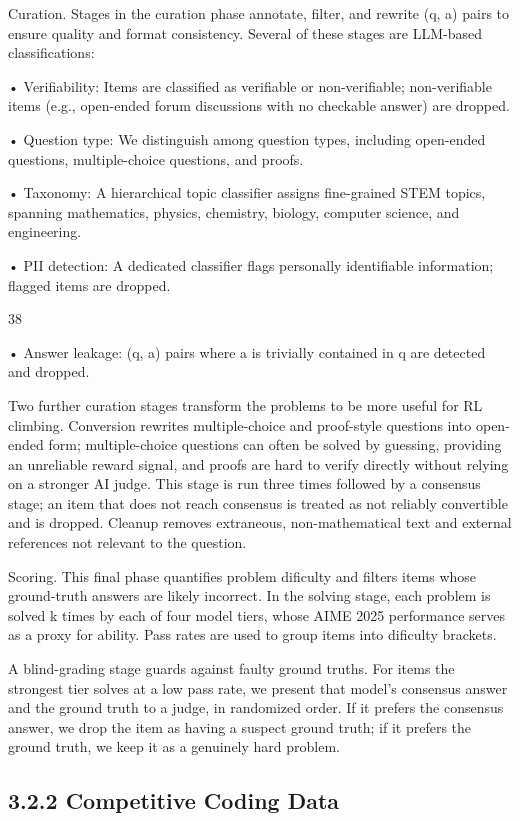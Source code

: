 \documentclass[
  10
]{article}
\begin{document}
Curation. Stages in the curation phase annotate, filter, and rewrite (q,
a) pairs to ensure quality and format consistency. Several of these
stages are LLM-based classifications:

• Verifiability: Items are classified as verifiable or non-verifiable;
non-verifiable items (e.g., open-ended forum discussions with no
checkable answer) are dropped.

• Question type: We distinguish among question types, including
open-ended questions, multiple-choice questions, and proofs.

• Taxonomy: A hierarchical topic classifier assigns fine-grained STEM
topics, spanning mathematics, physics, chemistry, biology, computer
science, and engineering.

• PII detection: A dedicated classifier flags personally identifiable
information; flagged items are dropped.

38

• Answer leakage: (q, a) pairs where a is trivially contained in q are
detected and dropped.

Two further curation stages transform the problems to be more useful for
RL climbing. Conversion rewrites multiple-choice and proof-style
questions into open-ended form; multiple-choice questions can often be
solved by guessing, providing an unreliable reward signal, and proofs
are hard to verify directly without relying on a stronger AI judge. This
stage is run three times followed by a consensus stage; an item that
does not reach consensus is treated as not reliably convertible and is
dropped. Cleanup removes extraneous, non-mathematical text and external
references not relevant to the question.

Scoring. This final phase quantifies problem dificulty and filters items
whose ground-truth answers are likely incorrect. In the solving stage,
each problem is solved k times by each of four model tiers, whose AIME
2025 performance serves as a proxy for ability. Pass rates are used to
group items into dificulty brackets.

A blind-grading stage guards against faulty ground truths. For items the
strongest tier solves at a low pass rate, we present that model's
consensus answer and the ground truth to a judge, in randomized order.
If it prefers the consensus answer, we drop the item as having a suspect
ground truth; if it prefers the ground truth, we keep it as a genuinely
hard problem.

\subsection{3.2.2 Competitive Coding
Data}\label{competitive-coding-data}
\end{document}
